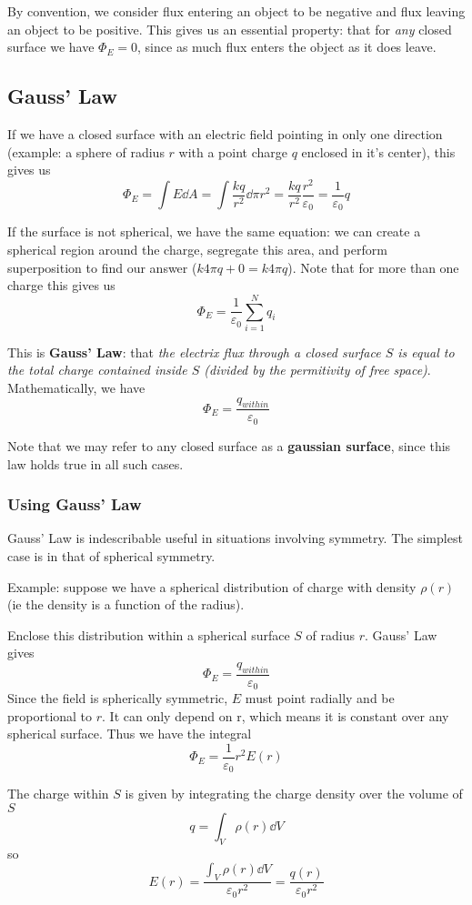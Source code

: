 \documentclass[12pt]{article}
\newcommand{\inint}[2]{\int #1 \dd #2}
\begin{document}
By convention, we consider flux entering an object to be negative and flux leaving an object to be positive. This gives us an essential property: that for \emph{any} closed surface we have $\Phi_E = 0$, since as much flux enters the object as it does leave.

\subsection*{Gauss' Law}
If we have a closed surface with an electric field pointing in only one direction (example: a sphere of radius $r$ with a point charge $q$ enclosed in it's center), this gives us \[ \Phi_E = \inint{E}{A} = \inint{\frac{kq}{r^2}}{\pi r^2} = \frac{kq}{r^2} \frac{r^2}{\varepsilon_0} = \frac{1}{\varepsilon_0} q \]

If the surface is not spherical, we have the same equation: we can create a spherical region around the charge, segregate this area, and perform superposition to find our answer ($k 4\pi q + 0 = k 4\pi q$). Note that for more than one charge this gives us \[ \Phi_E = \frac{1}{\varepsilon_0} \sum_{i = 1}^N q_i \]

This is {\bf Gauss' Law}: that \emph{the electrix flux through a closed surface $S$ is equal to the total charge contained inside $S$ (divided by the permitivity of free space)}. Mathematically, we have \[ \Phi_E = \frac{q_{within}}{\varepsilon_0} \]

Note that we may refer to any closed surface as a {\bf gaussian surface}, since this law holds true in all such cases.

\subsubsection*{Using Gauss' Law}
Gauss' Law is indescribable useful in situations involving symmetry. The simplest case is in that of spherical symmetry.

Example: suppose we have a spherical distribution of charge with density $\rho(r)$ (ie the density is a function of the radius).

Enclose this distribution within a spherical surface $S$ of radius $r$. Gauss' Law gives \[ \Phi_E = \frac{q_{within}}{\varepsilon_0} \] Since the field is spherically symmetric, $E$ must point radially and be proportional to $r$. It can only depend on r, which means it is constant over any spherical surface. Thus we have the integral \[ \Phi_E = \frac{1}{\varepsilon_0} r^2 E(r) \]

The charge within $S$ is given by integrating the charge density over the volume of $S$ \[ q = \int_V \rho(r) \dd V \] so \[ E(r) = \frac{\int_V \rho(r) \dd V}{\varepsilon_0 r^2} = \frac{q(r)}{\varepsilon_0 r^2} \]
\end{document}
